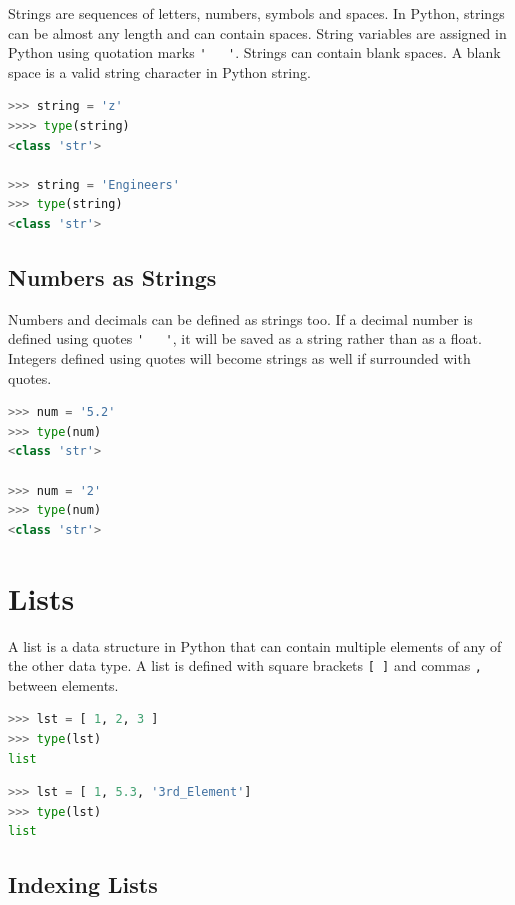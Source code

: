 \documentclass{book}
\begin{document}
    Strings are sequences of letters, numbers, symbols and spaces. In
Python, strings can be almost any length and can contain spaces. String
variables are assigned in Python using quotation marks
\lstinline!'   '!. Strings can contain blank spaces. A blank space is a
valid string character in Python string.

\begin{lstlisting}[language=Python]
>>> string = 'z'
>>>> type(string)
<class 'str'>

>>> string = 'Engineers'
>>> type(string)
<class 'str'>
\end{lstlisting}

    \subsection{Numbers as Strings}\label{numbers-as-strings}

Numbers and decimals can be defined as strings too. If a decimal number
is defined using quotes \lstinline!'   '!, it will be saved as a string
rather than as a float. Integers defined using quotes will become
strings as well if surrounded with quotes.

\begin{lstlisting}[language=Python]
>>> num = '5.2'
>>> type(num)
<class 'str'>

>>> num = '2'
>>> type(num)
<class 'str'>
\end{lstlisting}

    \section{Lists}\label{lists}

    A list is a data structure in Python that can contain multiple elements
of any of the other data type. A list is defined with square brackets
\lstinline![ ]! and commas \lstinline!,! between elements.

\begin{lstlisting}[language=Python]
>>> lst = [ 1, 2, 3 ]
>>> type(lst)
list
\end{lstlisting}

\begin{lstlisting}[language=Python]
>>> lst = [ 1, 5.3, '3rd_Element']
>>> type(lst)
list
\end{lstlisting}

    \subsection{Indexing Lists}\label{indexing-lists}
\end{document}
